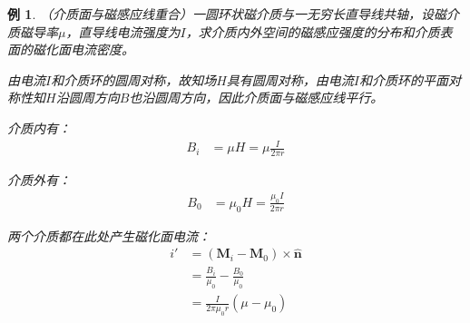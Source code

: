 \documentclass[12pt,onecolumn,a4paper]{book}
\newtheorem*{example}{例}
\numberwithin{table}{subsection}
\numberwithin{equation}{subsection}
\begin{document}
    \begin{example}
        （介质面与磁感应线重合）一圆环状磁介质与一无穷长直导线共轴，设磁介质磁导率$\mu$，直导线电流强度为$I$，求介质内外空间的磁感应强度的分布和介质表面的磁化面电流密度。

        由电流$I$和介质环的圆周对称，故知场$H$具有圆周对称，由电流$I$和介质环的平面对称性知$H$沿圆周方向$B$也沿圆周方向，因此介质面与磁感应线平行。

        介质内有：
        \begin{align}
            B_i & = \mu H = \mu \frac{I}{2\pi r}
        \end{align}

        介质外有：
        \begin{align}
            B_0 & = \mu_0 H = \frac{\mu_0 I}{2\pi r}
        \end{align}

        两个介质都在此处产生磁化面电流：
        \begin{align}
            i' & = (\mathbf{M}_i - \mathbf{M}_0) \times \hat{\mathbf{n}} \\
               & = \frac{B_i}{\mu_0} - \frac{B_0}{\mu_0}                 \\
               & = \frac{I}{2\pi\mu_0 r} (\mu - \mu_0)
        \end{align}
    \end{example}
\end{document}

